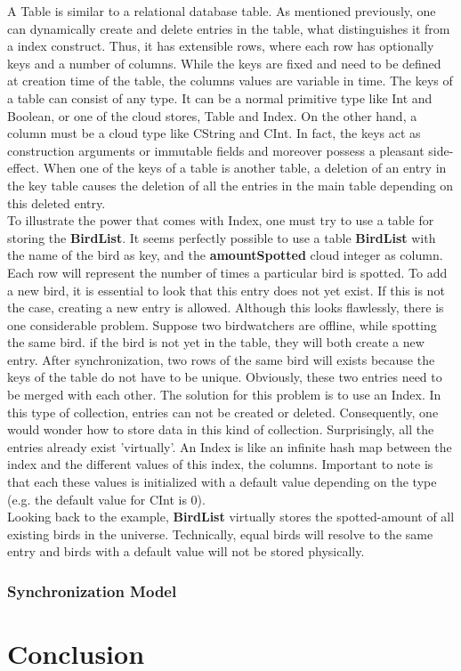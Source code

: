 \documentclass[a4paper,12pt]{report}
\begin{document}
A \textcolor{codeblue}{Table} is similar to a relational database table. As mentioned previously, one can dynamically create and delete entries in the table, what distinguishes it from a index construct. Thus, it has extensible rows, where each row has optionally keys and a number of columns. While the keys are fixed and need to be defined at creation time of the table, the columns values are variable in time. The keys of a table can consist of any type. It can be a normal primitive type like \textcolor{codedarkblue}{Int} and \textcolor{codedarkblue}{Boolean}, or one of the cloud stores, \textcolor{codeblue}{Table} and \textcolor{codeblue}{Index}. On the other hand, a column must be a cloud type like \textcolor{codedarkblue}{CString} and \textcolor{codedarkblue}{CInt}. In fact, the keys act as construction arguments or immutable fields and moreover possess a pleasant side-effect. When one of the keys of a table is another table, a deletion of an entry in the key table causes the deletion of all the entries in the main table depending on this deleted entry. \\

To illustrate the power that comes with \textcolor{codeblue}{Index}, one must try to use a table for storing the \textbf{BirdList}. It seems perfectly possible to use a table \textbf{BirdList} with the name of the bird as key, and the \textbf{amountSpotted} cloud integer as column. Each row will represent the number of times a particular bird is spotted. To add a new bird, it is essential to look that this entry does not yet exist. If this is not the case, creating a new entry is allowed. Although this looks flawlessly, there is one considerable problem. Suppose two birdwatchers are offline, while spotting the same bird. if the bird is not yet in the table, they will both create a new entry. After synchronization, two rows of the same bird will exists because the keys of the table do not have to be unique. Obviously, these two entries need to be merged with each other. The solution for this problem is to use an \textcolor{codeblue}{Index}. In this type of collection, entries can not be created or deleted. Consequently, one would wonder how to store data in this kind of collection. Surprisingly, all the entries already exist 'virtually'. An \textcolor{codeblue}{Index} is like an infinite hash map between the index and the different values of this index, the columns. Important to note is that each these values is initialized with a default value depending on the type (e.g. the default value for \textcolor{codedarkblue}{CInt} is 0). \\
Looking back to the example, \textbf{BirdList} virtually stores the spotted-amount of all existing birds in the universe. Technically, equal birds will resolve to the same entry and birds with a default value will not be stored physically. \\




\subsection{Synchronization Model}\label{subsec:SynchronizationModel}

\chapter{Conclusion}\label{cha:Conclusion} %
\end{document}
